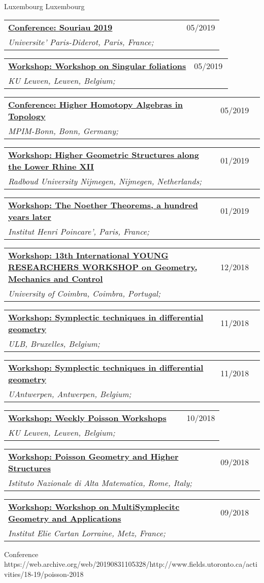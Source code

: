 \documentclass[a4paper]{article}
\newcommand{\longvoice}[8]{
	\begin{tabular}{p{0.83\linewidth} p{0.17\linewidth} }
		\textbf{\href{#3}{#2: #1}} & #4 
		\\ 
		\textit{#5, #6, #7;} & {\small\emph{#8}}
	\end{tabular}
	\vspace{.5em}
}
\begin{document}
		{Luxembourg}
		{Luxembourg}
		{}
	\longvoice{Souriau 2019}
		{Conference}
		{https://web.archive.org/web/20190831102558/http://souriau2019.fr/?page_id=2}
		{05/2019}
		{Universite' Paris-Diderot}
		{Paris}
		{France}
		{}
	\longvoice{Workshop on Singular foliations}
		{Workshop}
		{https://wis.kuleuven.be/agenda/sem-geometry/sem-geometry-upcoming}
		{05/2019}
		{KU Leuven}
		{Leuven}
		{Belgium}
		{}
	\longvoice{Higher Homotopy Algebras in Topology}
		{Conference}
		{https://web.archive.org/web/20190831103619/https://www.mpim-bonn.mpg.de/node/9245}
		{05/2019}
		{MPIM-Bonn}
		{Bonn}
		{Germany}
		{}
	\longvoice{Higher Geometric Structures along the Lower Rhine XII}
		{Workshop}
		{https://web.archive.org/web/20190831103524/https://www.math.ru.nl/~sagave/higher-structures-XII/}
		{01/2019}
		{Radboud University Nijmegen}
		{Nijmegen}
		{Netherlands}
		{}
	\longvoice{The Noether Theorems, a hundred years later}
		{Workshop}
		{https://web.archive.org/web/20190831105634/http://noether.iecl.univ-lorraine.fr/noether_en.html}
		{01/2019}
		{Institut Henri Poincare'}
		{Paris}
		{France}
		{}
	\longvoice{13th International YOUNG RESEARCHERS WORKSHOP on Geometry, Mechanics and Control}
		{Workshop}
		{https://web.archive.org/web/20190831103121/http://www.uc.pt/en/congressos/13yrw/programa}
		{12/2018}
		{University of Coimbra}
		{Coimbra}
		{Portugal}
		{}
	\longvoice{Symplectic techniques in differential geometry}
		{Workshop}
		{https://www.uantwerpen.be/nl/personeel/sonja-hohloch/private-webpage/excellence-of-scienc/minicourses/}
		{11/2018}
		{ULB}
		{Bruxelles}
		{Belgium}
		{}
	\longvoice{Symplectic techniques in differential geometry}
		{Workshop}
		{https://www.uantwerpen.be/nl/personeel/sonja-hohloch/private-webpage/excellence-of-scienc/minicourses/}
		{11/2018}
		{UAntwerpen}
		{Antwerpen}
		{Belgium}
		{}
	\longvoice{Weekly Poisson Workshops}
		{Workshop}
		{https://wis.kuleuven.be/meetkunde/PoissonWorkingGroup}
		{10/2018}
		{KU Leuven}
		{Leuven}
		{Belgium}
		{}
	\longvoice{Poisson Geometry and Higher Structures}
		{Workshop}
		{https://web.archive.org/web/20190831103317/http://www1.mat.uniroma1.it/ricerca/convegni/2018/hippo2018/index.html}
		{09/2018}
		{Istituto Nazionale di Alta Matematica}
		{Rome}
		{Italy}
		{}
	\longvoice{Workshop on MultiSymplecitc Geometry and Applications}
		{Workshop}
		{https://web.archive.org/web/20180704152639/http://www.math.univ-metz.fr/~wurzbacher/GEMSA.html}
		{09/2018}
		{Institut Elie Cartan Lorraine}
		{Metz}
		{France}
		{}
		{Conference}
		{https://web.archive.org/web/20190831105328/http://www.fields.utoronto.ca/activities/18-19/poisson-2018}
\end{document}
